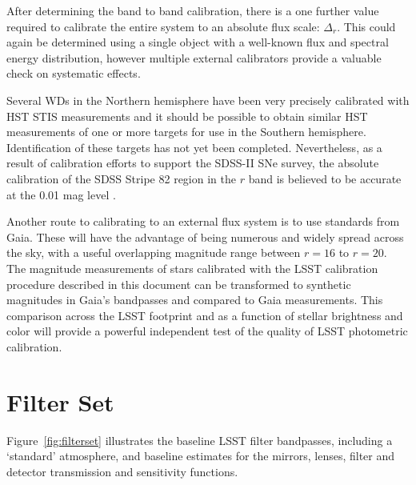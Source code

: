 \documentclass[12pt,preprint]{aastex}
\begin{document}
After determining the band to band calibration, there is a one further
value required to calibrate the entire system to an absolute flux
scale: $\Delta_r$.  This could again be determined using a single
object with a well-known flux and spectral energy distribution,
however multiple external calibrators provide a valuable check on
systematic effects. 

Several WDs in the Northern hemisphere have been very precisely
calibrated with HST STIS measurements \citep{2004AJ....128.3053B} and
it should be possible to obtain similar HST measurements of one or
more targets for use in the Southern hemisphere. Identification of
these targets has not yet been completed. Nevertheless, as a result of
calibration efforts to support the SDSS-II SNe survey, the absolute
calibration of the SDSS Stripe 82 region in the $r$ band is believed
to be accurate at the 0.01 mag level \citep{Frieman2008}. 

Another route to calibrating to an external flux system is to use
standards from Gaia. These will have the advantage of being numerous
and widely spread across the sky, with a useful overlapping magnitude range between
$r=16$ to $r=20$.  The magnitude measurements of stars calibrated with
the LSST calibration procedure described in this document can be
transformed to synthetic magnitudes in Gaia's bandpasses and compared
to Gaia measurements. This comparison across the LSST footprint and as
a function of stellar brightness and color will provide a powerful
independent test of the quality of LSST photometric calibration. 





\appendix

\newpage
\section{Filter Set}

Figure~\ref{fig:filterset} illustrates the baseline LSST filter
bandpasses, including a `standard' atmosphere, and baseline estimates
for the mirrors, lenses, filter and detector transmission and
sensitivity functions. 
\end{document}
